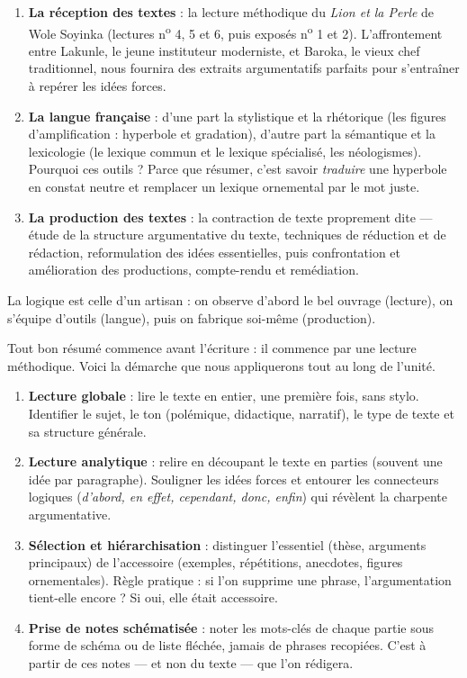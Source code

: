 \documentclass[11pt]{article}
\newcommand{\cle}[1]{{\popxbold\color{popdark}#1}}
\newcounter{popsec}
\newcounter{popsub}
\newcommand{\courssub}[1]{%
  \stepcounter{popsub}%
  \par\vspace{9pt}\noindent{\popxbold\fontsize{11.5}{13}\selectfont\color{popink}{\color{poporange}\thepopsec.\thepopsub}\hspace{6pt}#1}\par\nopagebreak\vspace{4pt}
}
\begin{document}
\begin{enumerate}
\item \textbf{La réception des textes} : la lecture méthodique du \emph{Lion et la Perle} de Wole Soyinka (lectures n\textsuperscript{o} 4, 5 et 6, puis exposés n\textsuperscript{o} 1 et 2). L'affrontement entre Lakunle, le jeune instituteur moderniste, et Baroka, le vieux chef traditionnel, nous fournira des extraits argumentatifs parfaits pour s'entraîner à repérer les idées forces.
\item \textbf{La langue française} : d'une part la stylistique et la rhétorique (les figures d'\cle{amplification} : hyperbole et gradation), d'autre part la sémantique et la lexicologie (le \cle{lexique commun} et le \cle{lexique spécialisé}, les \cle{néologismes}). Pourquoi ces outils ? Parce que résumer, c'est savoir \emph{traduire} une hyperbole en constat neutre et remplacer un lexique ornemental par le mot juste.
\item \textbf{La production des textes} : la contraction de texte proprement dite — étude de la \cle{structure argumentative} du texte, techniques de \cle{réduction} et de rédaction, reformulation des idées essentielles, puis confrontation et amélioration des productions, compte-rendu et remédiation.
\end{enumerate}

La logique est celle d'un artisan : on observe d'abord le bel ouvrage (lecture), on s'équipe d'outils (langue), puis on fabrique soi-même (production).

\courssub{Les quatre temps de la lecture active}

Tout bon résumé commence avant l'écriture : il commence par une lecture méthodique. Voici la démarche que nous appliquerons tout au long de l'unité.

\begin{methode}
\begin{enumerate}
\item \textbf{Lecture globale} : lire le texte en entier, une première fois, sans stylo. Identifier le sujet, le ton (polémique, didactique, narratif), le type de texte et sa structure générale.
\item \textbf{Lecture analytique} : relire en découpant le texte en parties (souvent une idée par paragraphe). Souligner les idées forces et entourer les connecteurs logiques (\emph{d'abord, en effet, cependant, donc, enfin}) qui révèlent la charpente argumentative.
\item \textbf{Sélection et hiérarchisation} : distinguer l'\cle{essentiel} (thèse, arguments principaux) de l'\cle{accessoire} (exemples, répétitions, anecdotes, figures ornementales). Règle pratique : si l'on supprime une phrase, l'argumentation tient-elle encore ? Si oui, elle était accessoire.
\item \textbf{Prise de notes schématisée} : noter les mots-clés de chaque partie sous forme de schéma ou de liste fléchée, jamais de phrases recopiées. C'est à partir de ces notes — et non du texte — que l'on rédigera.
\end{enumerate}
\end{methode}
\end{document}
